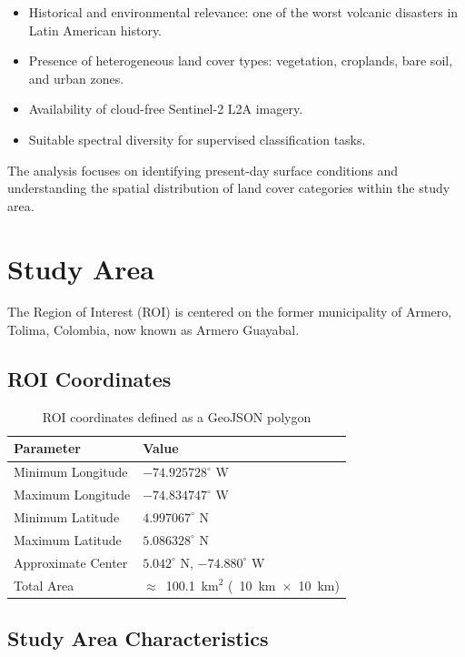 \documentclass[12pt,a4paper]{article}
\begin{document}
\begin{itemize}
    \item Historical and environmental relevance: one of the worst volcanic disasters in Latin American history.
    \item Presence of heterogeneous land cover types: vegetation, croplands, bare soil, and urban zones.
    \item Availability of cloud-free Sentinel-2 L2A imagery.
    \item Suitable spectral diversity for supervised classification tasks.
\end{itemize}

The analysis focuses on identifying present-day surface conditions and understanding the spatial distribution of land cover categories within the study area.

\section{Study Area}

The Region of Interest (ROI) is centered on the former municipality of Armero, Tolima, Colombia, now known as Armero Guayabal.

\subsection{ROI Coordinates}

\begin{table}[H]
\centering
\begin{tabular}{|m{5cm}|m{7cm}|}
\hline
\textbf{Parameter} & \textbf{Value} \\
\hline
Minimum Longitude & $-74.925728^\circ$ W \\
\hline
Maximum Longitude & $-74.834747^\circ$ W \\
\hline
Minimum Latitude  & $4.997067^\circ$ N \\
\hline
Maximum Latitude  & $5.086328^\circ$ N \\
\hline
Approximate Center & $5.042^\circ$ N, $-74.880^\circ$ W \\
\hline
Total Area & $\approx$~100.1~km$^2$ (~10~km~$\times$~10~km) \\
\hline
\end{tabular}
\caption{ROI coordinates defined as a GeoJSON polygon}
\end{table}

\subsection{Study Area Characteristics}
\end{document}
